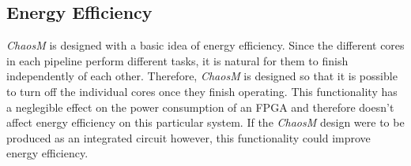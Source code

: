 
\subsection{Energy Efficiency}

\textit{ChaosM} is designed with a basic idea of energy efficiency. Since the
different cores in each pipeline perform different tasks, it is natural for them
to finish independently of each other. Therefore, \textit{ChaosM} is designed so
that it is possible to turn off the individual cores once they finish operating.
This functionality has a neglegible effect on the power consumption of an FPGA
and therefore doesn't affect energy efficiency on this particular system. If the
\textit{ChaosM} design were to be produced as an integrated circuit
however, this functionality could improve energy efficiency.
